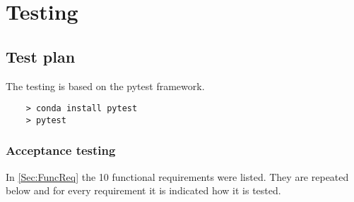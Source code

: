 \chapter{Testing} \label{Chp:Test}

\section{Test plan}

The testing is based on the pytest framework.

\begin{Verbatim}
    > conda install pytest
    > pytest
\end{Verbatim}

\subsection{Acceptance testing}

In \autoref{Sec:FuncReq} the 10 functional requirements were listed.
They are repeated below and for every requirement it is indicated how it is tested.

